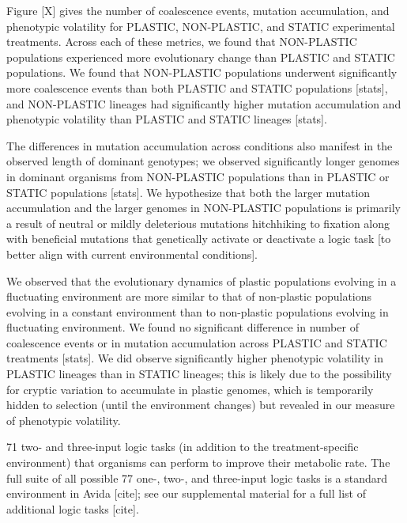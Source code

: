 Figure [X] gives the number of coalescence events, mutation accumulation, and phenotypic volatility for PLASTIC, NON-PLASTIC, and STATIC experimental treatments.
Across each of these metrics, we found that NON-PLASTIC populations experienced more evolutionary change than PLASTIC and STATIC populations.
We found that NON-PLASTIC populations underwent significantly more coalescence events than both PLASTIC and STATIC populations [stats], and NON-PLASTIC lineages had significantly higher mutation accumulation and phenotypic volatility than PLASTIC and STATIC lineages [stats].

The differences in mutation accumulation across conditions also manifest in the observed length of dominant genotypes; we observed significantly longer genomes in dominant organisms from NON-PLASTIC populations than in PLASTIC or STATIC populations [stats].
We hypothesize that both the larger mutation accumulation and the larger genomes in NON-PLASTIC populations is primarily a result of neutral or mildly deleterious mutations hitchhiking to fixation along with beneficial mutations that genetically activate or deactivate a logic task [to better align with current environmental conditions].


We observed that the evolutionary dynamics of plastic populations evolving in a fluctuating environment are more similar to that of non-plastic populations evolving in a constant environment than to non-plastic populations evolving in fluctuating environment.
We found no significant difference in number of coalescence events or in mutation accumulation across PLASTIC and STATIC treatments [stats].
We did observe significantly higher phenotypic volatility in PLASTIC lineages than in STATIC lineages; this is likely due to the possibility for cryptic variation to accumulate in plastic genomes, which is temporarily hidden to selection (until the environment changes) but revealed in our measure of phenotypic volatility.




71 two- and three-input logic tasks (in addition to the treatment-specific environment) that organisms can perform to improve their metabolic rate. 
The full suite of all possible 77 one-, two-, and three-input logic tasks is a standard environment in Avida [cite]; see our supplemental material for a full list of additional logic tasks [cite].

